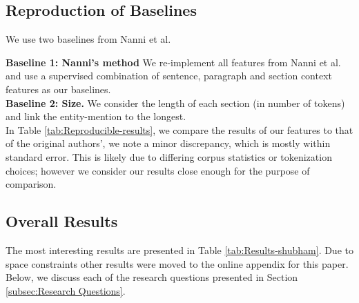 \subsection{Reproduction of Baselines}
\label{subsec:Reproduction of Baselines}

We use two baselines from Nanni et al.

\noindent
\textbf{Baseline 1: Nanni's method} We re-implement all features from Nanni et al. \cite{nanni2018entity} and use a supervised combination of sentence, paragraph and section context features as our baselines. \\
\textbf{Baseline 2: Size.} We consider the length of each section (in number of tokens) and link the entity-mention to the longest. \\


In Table \ref{tab:Reproducible-results}, we compare the results of our features to that of the original authors', we note a minor discrepancy, which is mostly within standard error. This is likely due to differing corpus statistics or tokenization choices; however we consider our results close enough for the purpose of comparison. 


\subsection{Overall Results}
\label{subsec:Results}
The most interesting results are presented in Table \ref{tab:Results-shubham}. Due to space constraints other results were moved to the online appendix for this paper. Below, we discuss each of the research questions presented in Section \ref{subsec:Research Questions}.


